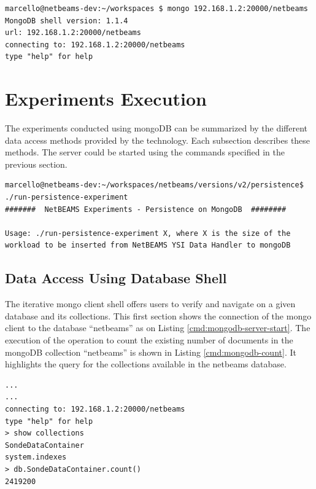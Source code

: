 \lstset{label=cmd:mongodb-client-start,caption=Starting the Server}
\begin{lstlisting}
marcello@netbeams-dev:~/workspaces $ mongo 192.168.1.2:20000/netbeams
MongoDB shell version: 1.1.4
url: 192.168.1.2:20000/netbeams
connecting to: 192.168.1.2:20000/netbeams
type "help" for help
\end{lstlisting}

\section{Experiments Execution}
\label{sec:experiment-execution}

The experiments conducted using mongoDB can be summarized by the different data
access methods provided by the technology. Each subsection describes these 
methods. The server could be started using the commands specified in the
previous section.

\lstset{label=cmd:run-persistence-experiment,caption=Running main experiment
shell script}
\begin{lstlisting}
marcello@netbeams-dev:~/workspaces/netbeams/versions/v2/persistence$ ./run-persistence-experiment 
#######  NetBEAMS Experiments - Persistence on MongoDB  ########

Usage: ./run-persistence-experiment X, where X is the size of the workload to be inserted from NetBEAMS YSI Data Handler to mongoDB
\end{lstlisting}


\subsection{Data Access Using Database Shell}
\label{sec:mongodb-user-experience}

The iterative mongo client shell offers users to verify and navigate on a
given database and its collections. This first section shows the connection of
the mongo client to the database ``netbeams'' as on Listing
\ref{cmd:mongodb-server-start}. The execution of the operation to count the
existing number of documents in the mongoDB collection ``netbeams'' is shown in
Listing \ref{cmd:mongodb-count}. It highlights the query for the collections
available \cite{mongodb} in the netbeams database.

\lstset{label=cmd:mongodb-count,caption=Starting the Server}
\begin{lstlisting}
...
...
connecting to: 192.168.1.2:20000/netbeams
type "help" for help
> show collections
SondeDataContainer
system.indexes
> db.SondeDataContainer.count()
2419200
\end{lstlisting}

